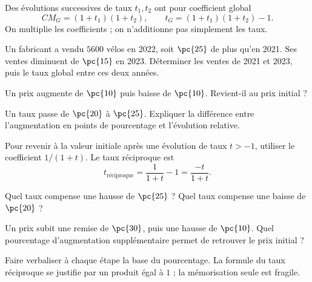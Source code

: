 \begin{keypoint}[Propriété]
Des évolutions successives de taux $t_1,t_2$ ont pour coefficient global
\[CM_G=(1+t_1)(1+t_2),\qquad t_G=(1+t_1)(1+t_2)-1.\]
On multiplie les coefficients ; on n'additionne pas simplement les taux.
\end{keypoint}
\begin{example}Un fabricant a vendu $5600$ vélos en 2022, soit $\pc{25}$ de plus qu'en 2021. Ses ventes diminuent de $\pc{15}$ en 2023. Déterminer les ventes de 2021 et 2023, puis le taux global entre ces deux années.\end{example}
\begin{example}Un prix augmente de $\pc{10}$ puis baisse de $\pc{10}$. Revient-il au prix initial ?\end{example}
\begin{example}Un taux passe de $\pc{20}$ à $\pc{25}$. Expliquer la différence entre l'augmentation en points de pourcentage et l'évolution relative.\end{example}

\begin{keypoint}[Propriété]
Pour revenir à la valeur initiale après une évolution de taux $t>-1$, utiliser le coefficient $1/(1+t)$. Le taux réciproque est
\[t_{\text{réciproque}}=\frac1{1+t}-1=\frac{-t}{1+t}.\]
\end{keypoint}
\begin{example}Quel taux compense une hausse de $\pc{25}$ ? Quel taux compense une baisse de $\pc{20}$ ?\end{example}
\begin{example}Un prix subit une remise de $\pc{30}$, puis une hausse de $\pc{10}$. Quel pourcentage d'augmentation supplémentaire permet de retrouver le prix initial ?\end{example}
\begin{teachernote}Faire verbaliser à chaque étape la base du pourcentage. La formule du taux réciproque se justifie par un produit égal à $1$ ; la mémorisation seule est fragile.\end{teachernote}
